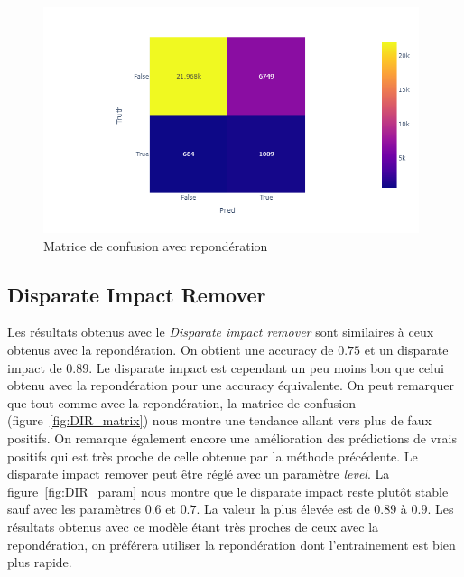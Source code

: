 \documentclass{article}
\begin{document}
    \begin{figure}[h]
        \centering
        \includegraphics[width=11cm]{./img/confusion_matrix_reweight.png}
        \caption{Matrice de confusion avec repondération}
        \label{fig:reweight_matrix}
    \end{figure}

    \subsection{Disparate Impact Remover}
    Les résultats obtenus avec le \textit{Disparate impact remover} sont similaires à ceux obtenus avec 
    la repondération. On obtient une accuracy de $0.75$ et un disparate impact de $0.89$. Le disparate 
    impact est cependant un peu moins bon que celui obtenu avec la repondération pour une accuracy équivalente.
    On peut remarquer que tout comme avec la repondération, la matrice de confusion (figure~\ref{fig:DIR_matrix})
    nous montre une tendance allant vers plus de faux positifs. On remarque également encore une amélioration
    des prédictions de vrais positifs qui est très proche de celle obtenue par la méthode précédente.
    Le disparate impact remover peut être réglé avec un paramètre \textit{level}. La figure~\ref{fig:DIR_param} 
    nous montre que le disparate impact reste plutôt stable sauf avec les paramètres $0.6$ et $0.7$.
    La valeur la plus élevée est de $0.89$ à $0.9$. Les résultats obtenus avec ce modèle étant très proches 
    de ceux avec la repondération, on préférera utiliser la repondération dont l'entrainement est bien 
    plus rapide.
\end{document}
